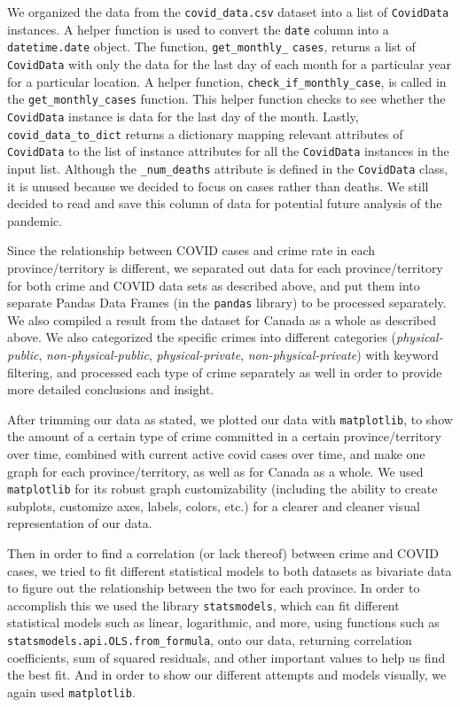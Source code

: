 \documentclass[fontsize=11pt]{article}
\begin{document}
We organized the data from the \verb+covid_data.csv+ dataset into a list of \verb+CovidData+ instances. A helper function is used to convert the \verb+date+ column into a \verb+datetime.date+ object. The function, \verb+get_monthly_+ \verb+cases+, returns a list of \verb+CovidData+ with only the data for the last day of each month for a particular year for a particular location. A helper function, \verb+check_if_monthly_case+, is called in the \verb+get_monthly_cases+ function. This helper function checks to see whether the \verb+CovidData+ instance is data for the last day of the month. Lastly, \verb+covid_data_to_dict+ returns a dictionary mapping relevant attributes of \verb+CovidData+ to the list of instance attributes for all the \verb+CovidData+ instances in the input list. Although the \verb+_num_deaths+ attribute is defined in the \verb+CovidData+ class, it is unused because we decided to focus on cases rather than deaths. We still decided to read and save this column of data for potential future analysis of the pandemic.

Since the relationship between COVID cases and crime rate in each province/territory is different, we separated out data for each province/territory for both crime and COVID data sets as described above, and put them into separate Pandas Data Frames (in the \verb+pandas+ library) to be processed separately. We also compiled a result from the dataset for Canada as a whole as described above. We also categorized the specific crimes into different categories (\textit{physical-public}, \textit{non-physical-public}, \textit{physical-private}, \textit{non-physical-private}) with keyword filtering, and processed each type of crime separately as well in order to provide more detailed conclusions and insight.

After trimming our data as stated, we plotted our data with \verb+matplotlib+, to show the amount of a certain type of crime committed in a certain province/territory over time, combined with current active covid cases over time, and make one graph for each province/territory, as well as for Canada as a whole. We used \verb+matplotlib+ for its robust graph customizability (including the ability to create subplots, customize axes, labels, colors, etc.) for a clearer and cleaner visual representation of our data.

Then in order to find a correlation (or lack thereof) between crime and COVID cases, we tried to fit different statistical models to both datasets as bivariate data to figure out the relationship between the two for each province. In order to accomplish this we used the library \verb+statsmodels+, which can fit different statistical models such as linear, logarithmic, and more, using functions such as \verb+statsmodels.api.OLS.from_formula+, onto our data, returning correlation coefficients, sum of squared residuals, and other important values to help us find the best fit. And in order to show our different attempts and models visually, we again used \verb+matplotlib+.
\end{document}
